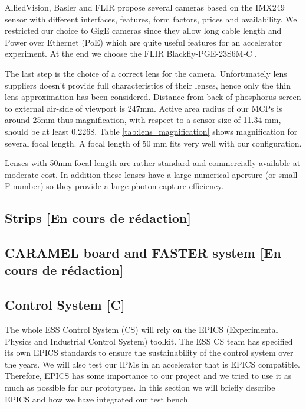 \begin{refsection}
  AlliedVision, Basler and FLIR propose several cameras based on the IMX249 sensor with different interfaces, features, form factors, prices and availability.
  We restricted our choice to GigE cameras since they allow long cable length and Power over Ethernet (PoE) which are quite useful features for an accelerator experiment.
  At the end we choose the FLIR Blackfly-PGE-23S6M-C \cite{blackfly2019}.

  The last step is the choice of a correct lens for the camera.
  Unfortunately lens suppliers doesn't provide full characteristics of their lenses, hence only the thin lens approximation has been considered.
  Distance from back of phosphorus screen to external air-side of viewport is 247mm. Active area radius of our MCPs is around 25mm thus magnification, with respect to a sensor size of 11.34 mm, should be at least 0.2268.
  Table \ref{tab:lens_magnification} shows magnification for several focal length. A focal length of 50 mm fits very well with our configuration.
  

  Lenses with 50mm focal length are rather standard and commercially available at moderate cost. In addition these lenses have a large numerical aperture (or small F-number) so they provide a large photon capture efficiency.

  \subsection{Strips [En cours de rédaction]}
  \subsection{CARAMEL board and FASTER system [En cours de rédaction]}
  \cite{ddc316}\cite{caramel2013}\cite{faster2013}\cite{rhb2012}
  \subsection{Control System [C]}
  The whole ESS Control System (CS) will rely on the EPICS (Experimental Physics and Industrial Control System) toolkit. The ESS CS team has specified its own EPICS standards to ensure the sustainability of the control system over the years. We will also test our IPMs in an accelerator that is EPICS compatible. Therefore, EPICS has some importance to our project and we tried to use it as much as possible for our prototypes. In this section we will briefly describe EPICS and how we have integrated our test bench.


\end{refsection}
